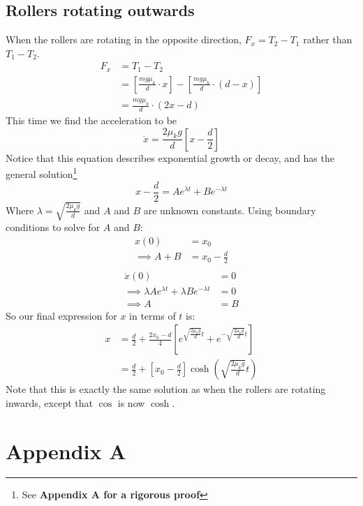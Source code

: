 \documentclass{article}
\begin{document}
\subsection{Rollers rotating outwards}
When the rollers are rotating in the opposite direction, $F_x = T_2 - T_1$ rather than $T_1 - T_2$.
\begin{align}
    F_x &= T_1 - T_2\\
    &= \left[ \frac{mg\mu_k}{d} \cdot x \right] - \left[ \frac{mg\mu_k}{d} \cdot (d-x) \right]\\
    &= \frac{mg\mu_k}{d} \cdot (2x-d)
\end{align}
This time we find the acceleration to be
\begin{equation}
    \ddot{x} = \frac{2\mu_kg}{d} \left[ x - \frac{d}{2} \right]
\end{equation}
Notice that this equation describes exponential growth or decay, and has the general solution\footnote{See \bf{Appendix A} for a rigorous proof}
\begin{equation}
    x - \frac{d}{2} = A e^{\lambda t} + B e^{-\lambda t} 
\end{equation}
Where $\lambda=\sqrt{\frac{2\mu_kg}{d}}$ and $A$ and $B$ are unknown constants. Using boundary conditions to solve for $A$ and $B$:
\begin{align}
    x(0) &= x_0\\
    \implies A + B &= x_0 - \frac{d}{2}\\
\end{align}
\begin{align}
    \dot{x}(0) &= 0\\
    \implies \lambda A e^{\lambda t} + \lambda B e^{-\lambda t} &= 0\\
    \implies A &= B
\end{align}
So our final expression for $x$ in terms of $t$ is:
\begin{align}
    x &= \frac{d}{2} + \frac{2x_0 - d}{4} \left[ e^{\sqrt{\frac{2\mu_kg}{d}} t} + e^{-\sqrt{\frac{2\mu_kg}{d}} t} \right]\\
    &= \frac{d}{2} + \left[ x_0 - \frac{d}{2} \right] \cosh \left( \sqrt{\frac{2\mu_kg}{d}} t \right)
\end{align}
Note that this is exactly the same solution as when the rollers are rotating inwards, except that $\cos$ is now $\cosh$. 
\section{Appendix A}
\end{document}
